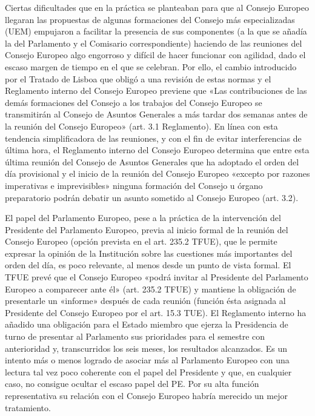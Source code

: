 \documentclass[10pt,a4paper]{article}
\begin{document}
Ciertas dificultades que en la práctica se planteaban para que al Consejo Europeo llegaran las propuestas de algunas formaciones del Consejo más especializadas (UEM) empujaron a facilitar la presencia de sus componentes (a la que se añadía la del Parlamento y el Comisario correspondiente) haciendo de las reuniones del Consejo Europeo algo engorroso y difícil de hacer funcionar con agilidad, dado el escaso margen de tiempo en el que se celebran. Por ello, el cambio introducido por el Tratado de Lisboa que obligó a una revisión de estas normas y el Reglamento interno del Consejo Europeo previene que «Las contribuciones de las demás formaciones del Consejo a los trabajos del Consejo Europeo se transmitirán al Consejo de Asuntos Generales a más tardar dos semanas antes de la reunión del Consejo Europeo» (art. 3.1 Reglamento). En línea con esta tendencia simplificadora de las reuniones, y con el fin de evitar interferencias de última hora, el Reglamento interno del Consejo Europeo determina que entre esta última reunión del Consejo de Asuntos Generales que ha adoptado el orden del día provisional y el inicio de la reunión del Consejo Europeo «excepto por razones imperativas e imprevisibles» ninguna formación del Consejo u órgano preparatorio podrán debatir un asunto sometido al Consejo Europeo (art. 3.2).

El papel del Parlamento Europeo, pese a la práctica de la intervención del Presidente del Parlamento Europeo, previa al inicio formal de la reunión del Consejo Europeo (opción prevista en el art. 235.2 TFUE), que le permite expresar la opinión de la Institución sobre las cuestiones más importantes del orden del día, es poco relevante, al menos desde un punto de vista formal. El TFUE prevé que el Consejo Europeo «podrá invitar al Presidente del Parlamento Europeo a comparecer ante él» (art. 235.2 TFUE) y mantiene la obligación de presentarle un «informe» después de cada reunión (función ésta asignada al Presidente del Consejo Europeo por el art. 15.3 TUE). El Reglamento interno ha añadido una obligación para el Estado miembro que ejerza la Presidencia de turno de presentar al Parlamento sus prioridades para el semestre con anterioridad y, transcurridos los seis meses, los resultados alcanzados. Es un intento más o menos logrado de asociar más al Parlamento Europeo con una lectura tal vez poco coherente con el papel del Presidente y que, en cualquier caso, no consigue ocultar el escaso papel del PE. Por su alta función representativa su relación con el Consejo Europeo habría merecido un mejor tratamiento.
\end{document}
